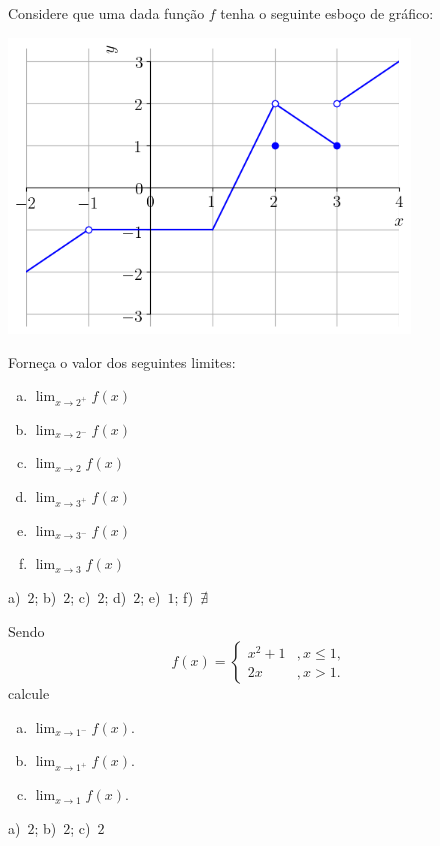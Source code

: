\begin{exer}\label{exer:limgraf_lat}
  Considere que uma dada função $f$ tenha o seguinte esboço de gráfico:

  \includegraphics[width=0.8\textwidth]{./cap_lim/dados/fig_exer_limgraf/fig_exer_limgraf}

  Forneça o valor dos seguintes limites:
  \begin{enumerate}[a)]
  \item $\displaystyle \lim_{x\to 2^+} f(x)$
  \item $\displaystyle \lim_{x\to 2^-} f(x)$
  \item $\displaystyle \lim_{x\to 2} f(x)$
  \item $\displaystyle \lim_{x\to 3^+} f(x)$
  \item $\displaystyle \lim_{x\to 3^-} f(x)$
  \item $\displaystyle \lim_{x\to 3} f(x)$
  \end{enumerate}
\end{exer}
\begin{resp}
  a)~$2$; b)~$2$; c)~$2$; d)~$2$; e)~$1$; f)~$\nexists$
\end{resp}

\begin{exer}
  Sendo
  \begin{equation}
    f(x) = \left\{
      \begin{array}{ll}
        x^2+1 &, x\leq 1,\\
        2x &, x>1.
      \end{array}
    \right.
  \end{equation}
  calcule
  \begin{enumerate}[a)]
  \item $\displaystyle \lim_{x\to 1^-} f(x)$.
  \item $\displaystyle \lim_{x\to 1^+} f(x)$.
  \item $\displaystyle \lim_{x\to 1} f(x)$.
  \end{enumerate}
\end{exer}
\begin{resp}
  a)~$2$; b)~$2$; c)~$2$
\end{resp}

